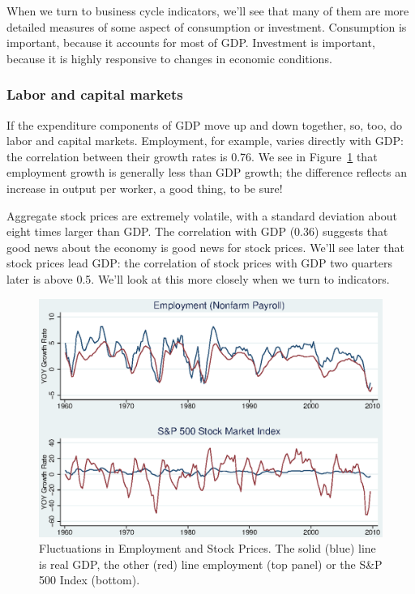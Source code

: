 \documentclass[letterpaper,12pt]{article}
\begin{document}
When we turn to business cycle indicators, we'll see that 
many of them are more detailed measures of 
some aspect of consumption or investment.
Consumption is important, because it accounts for most of GDP.
Investment is important, because it is highly responsive
to changes in economic conditions.  


\subsubsection*{Labor and capital markets}


If the expenditure components of GDP move up and down together, 
so, too, do labor and capital markets.  
Employment, for example, varies directly with GDP: 
the correlation between their growth rates is 0.76.
We see in Figure~\ref{fig:gother} that 
employment growth is generally less than GDP growth;  
the difference reflects an increase in output per worker, 
a good thing, to be sure!

Aggregate stock prices are extremely volatile, with a standard deviation
about eight times larger than GDP.
The correlation with GDP (0.36) suggests that 
good news about the economy is good news for stock prices.  
We'll see later that stock prices lead GDP:
the correlation of stock prices with GDP two quarters later is above 0.5.
We'll look at this more closely when we turn to indicators.  

%
\begin{figure}
    \centering
    \includegraphics[scale=0.8]{usgother.eps}
    \caption{Fluctuations in Employment and Stock Prices. 
    The solid (blue) line is real GDP, the other (red) line 
    employment (top panel) or the S\&P 500 Index (bottom).} 
    \label{fig:gother}%
\end{figure}
\end{document}
